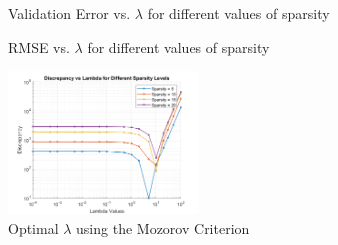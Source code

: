 \documentclass[a4paper,12pt]{article}
\begin{document}
\begin{figure}[htbp]
  \centering
  \caption{Validation Error vs. $\lambda$ for different values of sparsity}
  \label{fig:validationError}
\end{figure}

\begin{figure}[htbp]
  \centering
  \caption{RMSE vs. $\lambda$ for different values of sparsity}
  \label{fig:rmse}
\end{figure}

\begin{figure}[htbp]
  \centering
  \includegraphics[width=0.45\textwidth]{mozorovCriterion.png}
  \caption{Optimal $\lambda$ using the Mozorov Criterion}
  \label{fig:mozorov}
\end{figure}
\end{document}
